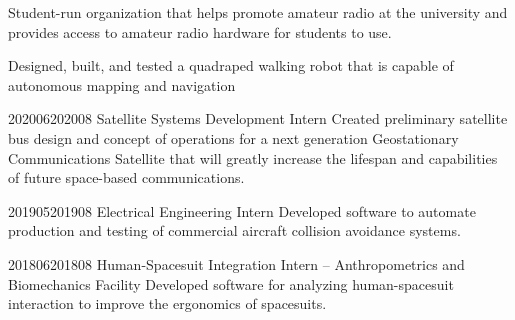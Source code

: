 \documentclass[letterpaper,ddMMMyyyy,nonstopmode]{simpleresumecv}
\begin{document}
\begin{Body}
                {Student-run organization that helps promote amateur
                    radio at the university and provides access to amateur
                    radio hardware for students to use.
                    }

            



        {Designed, built, and tested a quadraped walking robot that 
        is capable of autonomous mapping and navigation}




                {2020}{06}{2020}{08}
                {Satellite Systems Development Intern}
                {Created preliminary satellite bus design and concept of operations 
                for a next generation Geostationary Communications Satellite that will greatly increase the 
                lifespan and capabilities of future space-based communications. }

                {2019}{05}{2019}{08}
                {Electrical Engineering Intern}
                {Developed software to automate production and testing of commercial aircraft
                    collision avoidance systems.}

                {2018}{06}{2018}{08}
                {Human-Spacesuit Integration Intern -- Anthropometrics and Biomechanics Facility}
                {Developed software for analyzing human-spacesuit interaction to improve the ergonomics
                    of spacesuits.}


\end{Body}
\end{document}
